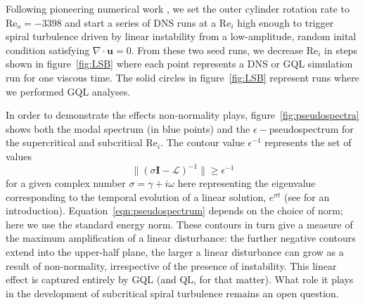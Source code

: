 \documentclass[openacc]{rstransa}%
\newcommand{\Reyn}{\mathrm{Re}}
\newcommand{\Lop}{\mathcal{L}}
\begin{document}
Following pioneering numerical work \cite{2009PhRvE..79c6309M, 2009PhRvE..80d6315M}, we set the outer cylinder rotation rate to $\Reyn_o = -3398$ and
start a series of DNS runs at a $\Reyn_i$ high enough to trigger spiral turbulence driven by linear instability from a low-amplitude, random inital condition satisfying $\nabla \cdot \mathbf{u} = 0$.
From these two seed runs, we decrease $\Reyn_i$ in steps shown in figure~\ref{fig:LSB} where each point represents a DNS or GQL simulation run for one viscous time. The solid circles in figure~\ref{fig:LSB} represent runs where we performed GQL analyses. 

In order to demonstrate the effects non-normality plays, figure~\ref{fig:pseudospectra} shows both the modal spectrum (in blue points) and the $\epsilon-$pseudospectrum for the supercritical and subcritical $\Reyn_i$. The contour value $\epsilon^{-1}$ represents the set of values 
\begin{equation}
\label{eqn:pseudospectrum}
    \lVert (\sigma \mathbf{I} - \Lop)^{-1} \rVert \geq \epsilon^{-1}
\end{equation}
for a given complex number $\sigma = \gamma + i\omega$ here representing the eigenvalue corresponding to the temporal evolution of a linear solution, $e^{\sigma t}$ (see \cite{trefethen2005spectra} for an introduction). Equation~\ref{eqn:pseudospectrum} depends on the choice of norm; here we use the standard energy norm. These contours in turn give a measure of the maximum amplification of a linear disturbance: the further negative contours extend into the upper-half plane, the larger a linear disturbance can grow as a result of non-normality, irrespective of the presence of instability. This linear effect is captured entirely by GQL (and QL, for that matter). What role it plays in the development of subcritical spiral turbulence remains an open question.
\end{document}
